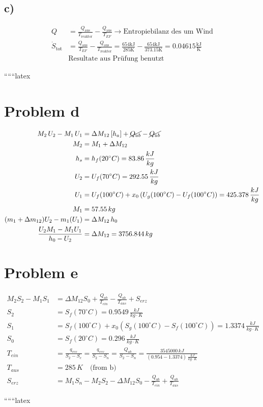 \subsection*{c)}
\begin{align*}
Q &= \frac{Q_{\text{aus}}}{T_{\text{reaktor}}} - \frac{Q_{\text{aus}}}{T_{EF}} \rightarrow \text{Entropiebilanz} \text{ des um Wind} \\
\dot{S}_{\text{tot}} &= \frac{Q_{\text{aus}}}{T_{EF}} - \frac{Q_{\text{aus}}}{T_{\text{reaktor}}} = \frac{654 \text{kJ}}{285 \text{K}} - \frac{654 \text{kJ}}{373.15 \text{K}} = 0.04615 \frac{\text{kJ}}{\text{K}} \\
&\text{Resultate aus Prüfung benutzt}
\end{align*}

``````latex

\section*{Problem d}

\begin{align*}
M_2 \, U_2 - M_1 \, U_1 &= \Delta M_{12} \, [h_a] + \cancel{Q_{ab}} - \cancel{Q_{ab}} \\
M_2 &= M_1 + \Delta M_{12} \\
h_s &= h_f(20^\circ C) = 83.86 \, \frac{kJ}{kg} \\
U_2 &= U_f(70^\circ C) = 292.55 \, \frac{kJ}{kg} \\
U_1 &= U_f(100^\circ C) + x_0 \left( U_g(100^\circ C) - U_f(100^\circ C) \right) = 425.378 \, \frac{kJ}{kg} \\
M_1 &= 57.55 \, kg \\
(m_1 + \Delta m_{12}) U_2 - m_1 (U_1) &= \Delta M_{12} \, h_0 \\
\frac{U_2 M_1 - M_1 U_1}{h_0 - U_2} &= \Delta M_{12} = 3756.844 \, kg
\end{align*}

\section*{Problem e}

\begin{align*}
M_2 S_2 - M_1 S_1 &= \Delta M_{12} S_0 + \frac{Q_{ab}}{T_{ein}} - \frac{Q_{ab}}{T_{aus}} + S_{erz} \\
S_2 &= S_f(70^\circ C) = 0.9549 \, \frac{kJ}{kg \cdot K} \\
S_1 &= S_f(100^\circ C) + x_0 \left( S_g(100^\circ C) - S_f(100^\circ C) \right) = 1.3374 \, \frac{kJ}{kg \cdot K} \\
S_0 &= S_f(20^\circ C) = 0.296 \, \frac{kJ}{kg \cdot K} \\
T_{ein} &= \frac{q_{rev}}{S_2 - S_e} = \frac{q_{rev}}{S_2 - S_n} = \frac{Q_{ab}}{S_2 - S_n} = \frac{3545000 \, kJ}{(0.954 - 1.3374) \, \frac{kJ}{kg \cdot K}} \\
T_{aus} &= 285 \, K \quad \text{(from b)} \\
S_{erz} &= M_1 S_n - M_2 S_2 - \Delta M_{12} S_0 - \frac{Q_{ab}}{T_{ein}} + \frac{Q_{ab}}{T_{aus}}
\end{align*}

``````latex


